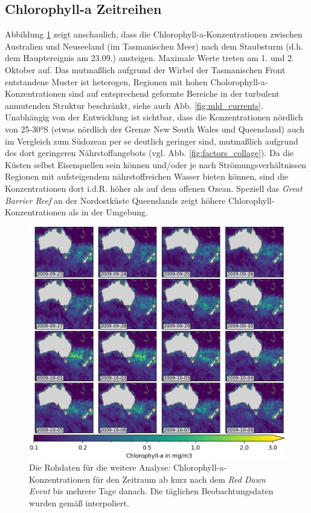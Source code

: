 \documentclass[12pt,a4paper,onecolumn]{scrartcl}
\begin{document}
\subsection{Chlorophyll-a Zeitreihen} \label{sec:chla_zeitreihen}
\sloppy 
Abbildung \ref{fig:chla_collage} zeigt anschaulich, dass die Chlorophyll-a-Konzentrationen zwischen Australien und Neuseeland (im Tasmanischen Meer) nach dem Staubsturm (d.h. dem Hauptereignis am 23.09.) ansteigen. Maximale Werte treten am 1. und 2. Oktober auf. Das mutmaßlich aufgrund der Wirbel der Tasmanischen Front \citep{Tilburg.2002} entstandene Muster ist heterogen, Regionen mit hohen Cholorophyll-a-Konzentrationen sind auf entsprechend geformte Bereiche in der turbulent anmutenden Struktur beschränkt, siehe auch Abb. \ref{fig:mld_currents}. Unabhängig von der Entwicklung ist sichtbar, dass die Konzentrationen nördlich von 25-30°S (etwas nördlich der Grenze New South Wales und Queensland) auch im Vergleich zum Südozean per se deutlich geringer sind, mutmaßlich aufgrund des dort geringeren Nährstoffangebots (vgl. Abb. \ref{fig:factors_collage}). Da die Küsten selbst Eisenquellen sein können und/oder je nach Strömungsverhältnissen Regionen mit aufsteigendem nährstoffreichen Wasser bieten können, sind die Konzentrationen dort i.d.R. höher als auf dem offenen Ozean. Speziell das \textit{Great Barrier Reef} an der Nordostküste Queenslands zeigt höhere Chlorophyll-Konzentrationen als in der Umgebung. 
\begin{figure}[!htb]
\includegraphics[width=\textwidth]{bilder/chl_collage.png}
\caption{Die Rohdaten für die weitere Analyse: Chlorophyll-a-Konzentrationen für den Zeitraum ab kurz nach dem \textit{Red Dawn Event} bis mehrere Tage danach. Die täglichen Beobachtungsdaten wurden gemäß \cite{Saulquin.2019} interpoliert.} \label{fig:chla_collage}
\end{figure}
\end{document}
